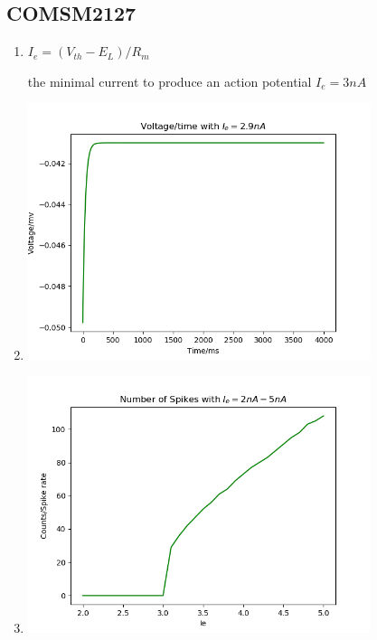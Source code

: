 \documentclass[fleqn,11pt]{article}
\begin{document}
\subsection*{COMSM2127}
\begin{enumerate}[1)]
\item  
  \par $I_e = (V_{th}-E_L)/R_m$
  \par the minimal current to produce an action potential  $I_e = 3nA$

\item
  \begin{center} 
    \includegraphics[width=10cm]{graphs/COMS2127_2.png}
  \end{center}

\item
  \begin{center} 
    \includegraphics[width=10cm]{graphs/COMS2127_3.png}
  \end{center}

\end{enumerate}
\end{document}
